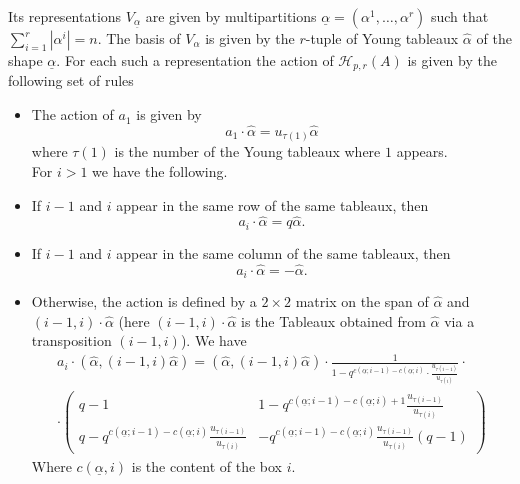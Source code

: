 \documentclass[12pt,reqno]{amsart}
\theoremstyle{definition}
\theoremstyle{remark}
\numberwithin{equation}{section}
\begin{document}
Its representations $V_{\underline{\alpha}}$ are given by multipartitions $\underline{\alpha}=(\alpha^1,\dots,\alpha^r)$ such that $\sum_{i=1}^r |\alpha^i|=n$. The basis of $V_{\alpha}$ is given by the $r$-tuple of Young tableaux $\widehat\alpha$ of the shape $\underline{\alpha}$. For each such a representation the action of $\mathcal{H}_{p,r}(A)$ is given by the following set of rules
\begin{itemize}
    \item The action of $a_1$ is given by
    \begin{equation}
        a_1 \cdot \widehat\alpha = u_{\tau(1)}\widehat\alpha
    \end{equation}
    where $\tau(1)$ is the number of the Young tableaux where $1$ appears.\\

    For $i>1$ we have the following.
    \item If $i-1$ and $i$ appear in the same row of the same tableaux, then
    \begin{equation}
        a_i \cdot \widehat\alpha = q\widehat\alpha.
    \end{equation}
    \item If $i-1$ and $i$ appear in the same column of the same tableaux, then
    \begin{equation}
        a_i \cdot \widehat\alpha = -\widehat\alpha.
    \end{equation}
    \item Otherwise, the action is defined by a $2\times 2$ matrix on the span of $\widehat\alpha$ and $(i-1,i)\cdot \widehat\alpha$ (here $(i-1,i)\cdot \widehat\alpha$ is the Tableaux obtained from $\widehat\alpha$ via a transposition $(i-1,i)$). We have
    \begin{multline}
        a_i\cdot (\widehat{\alpha},(i-1,i)\widehat{\alpha})=(\widehat{\alpha},(i-1,i)\widehat{\alpha})\cdot \frac{1}{1-q^{c(\underline\alpha;i-1)-c(\underline\alpha;i)} \cdot 
         \frac{u_{\tau(i-1)}}{u_{\tau(i)}}}\cdot \\ \cdot \begin{pmatrix}
        q-1 & 1-q^{c(\underline\alpha;i-1)-c(\underline\alpha;i)+1}\frac{u_{\tau(i-1)}}{u_{\tau(i)}}\\
        q-q^{c(\underline\alpha;i-1)-c(\underline\alpha;i)}\frac{u_{\tau(i-1)}}{u_{\tau(i)}} & -q^{c(\underline\alpha;i-1)-c(\underline\alpha;i)} \frac{u_{\tau(i-1)}}{u_{\tau(i)}} (q-1)
    \end{pmatrix}    
    \end{multline}
    Where $c(\underline{\alpha},i)$ is the content of the box $i$.
\end{itemize}
\end{document}
